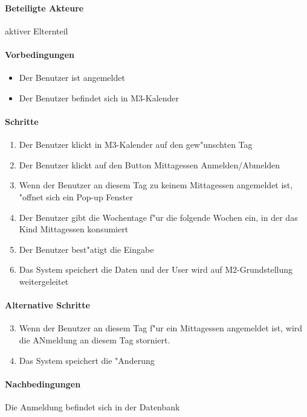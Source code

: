   \paragraph{Beteiligte Akteure}   \leavevmode \newline
    aktiver Elternteil
  \paragraph{Vorbedingungen}
  \begin{itemize}
   \item Der Benutzer ist angemeldet
   \item Der Benutzer befindet sich in M3-Kalender
  \end{itemize}

  \paragraph{Schritte}
  \begin{enumerate}
   \item Der Benutzer klickt in M3-Kalender auf den gew"unschten Tag
   \item Der Benutzer klickt auf den Button \dq Mittagessen Anmelden/Abmelden\dq
   \item Wenn der Benutzer an diesem Tag zu keinem Mittagessen angemeldet ist, "offnet sich ein Pop-up Fenster
   \item Der Benutzer gibt die Wochentage f"ur die folgende Wochen ein, in der das Kind Mittagessen konsumiert
   \item Der Benutzer best"atigt die Eingabe
   \item Das System speichert die Daten und der User wird auf M2-Grundstellung weitergeleitet
  \end{enumerate}

  \paragraph{Alternative Schritte}
  \begin{enumerate}
  \setcounter{enumi}{2}
   \item  Wenn der Benutzer an diesem Tag f"ur ein Mittagessen angemeldet ist, wird die ANmeldung an diesem Tag storniert.
   \item Das System speichert die "Anderung
  \end{enumerate}

  \paragraph{Nachbedingungen}
  Die Anmeldung befindet sich in der Datenbank

